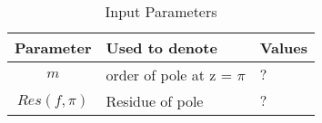 \begin{table}[ht]
\centering
\setlength{\extrarowheight}{8pt}
\caption{Input Parameters}
\begin{tabular}{|c|l|l|} 
\hline
\textbf{Parameter} & \textbf{Used to denote} & \textbf{Values} \\
\hline
$m$ & order of pole at z = $\pi$  & \multicolumn{1}{|p{1.3cm}|}{\centering $?$ }\\
\hline
$Res(f,\pi)$ & Residue of pole  & \multicolumn{1}{|p{1.3cm}|}{\centering $?$ }\\
\hline
\end{tabular}
 \vspace{4mm}
 \label{tab:table0}
\end{table}
